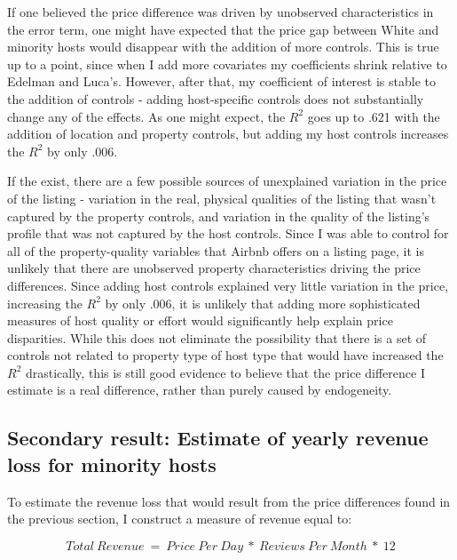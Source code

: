 \documentclass[11pt, oneside]{article}
\begin{document}
If one believed the price difference was driven by unobserved characteristics in the error term, one might have expected that the price gap between White and minority hosts would disappear with the addition of more controls. This is true up to a point, since when I add more covariates my coefficients shrink relative to Edelman and Luca's. However, after that, my coefficient of interest is stable to the addition of controls - adding host-specific controls does not substantially change any of the effects. As one might expect, the $R^2$ goes up to .621 with the addition of location and property controls, but adding my host controls increases the $R^2$ by only .006. 

If the exist, there are a few possible sources of unexplained variation in the price of the listing - variation in the real, physical qualities of the listing that wasn't captured by the property controls, and variation in the quality of the listing's profile that was not captured by the host controls. Since I was able to control for all of the property-quality variables that Airbnb offers on a listing page, it is unlikely that there are unobserved property characteristics driving the price differences. Since adding host controls explained very little variation in the price, increasing the $R^2$ by only .006, it is unlikely that adding more sophisticated measures of host quality or effort would significantly help explain price disparities. While this does not eliminate the possibility that there is a set of controls not related to property type of host type that would have increased the $R^2$ drastically, this is still good evidence to believe that the price difference I estimate is a real difference, rather than purely caused by endogeneity. 


\subsection{Secondary result: Estimate of yearly revenue loss for minority hosts}

To estimate the revenue loss that would result from the price differences found in the previous section, I construct a measure of revenue equal to: 

\[Total \: Revenue \ = \ Price \: Per \: Day \ * \ Reviews \: Per \: Month \ * \ 12\] 
\end{document}
